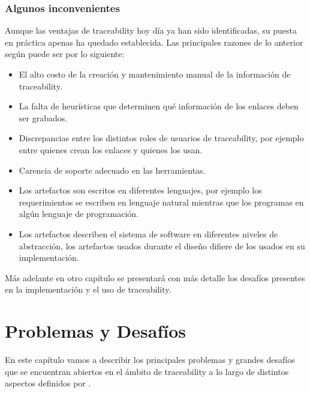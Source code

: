 \documentclass[a4paper,12pt,oneside]{book}
\begin{document}
\subsection{Algunos inconvenientes}

Aunque las ventajas de traceability hoy día ya han sido identificadas, su puesta en práctica apenas ha quedado establecida. Las principales razones de lo anterior según \cite{GrammelVoigt} puede ser por lo siguiente:

\begin{itemize}

 \item   El alto costo de la creación y mantenimiento manual de la información de     traceability.

\item    La falta de heurísticas que determinen qué información de los enlaces deben ser grabados.

 \item   Discrepancias entre los distintos roles de usuarios de traceability, por ejemplo entre quienes crean los enlaces y quienes los usan.

\item    Carencia de soporte adecuado en las herramientas.

\item    Los artefactos son escritos en diferentes lenguajes, por ejemplo los requerimientos se escriben en lenguaje natural mientras que los programas en algún lenguaje de programación.

\item    Los artefactos describen el sistema de software en diferentes niveles de abstracción, los artefactos usados durante el diseño difiere de los usados en su implementación.

\end{itemize}

Más adelante en otro capítulo se presentará con más detalle los desafíos presentes en la implementación y el uso de traceability.




\chapter{Problemas y Desafíos}

En este capítulo vamos a describir los principales problemas y grandes desafíos que se encuentran abiertos en el ámbito de traceability a lo largo de distintos aspectos definidos por \cite{Excellence}. 
\end{document}
